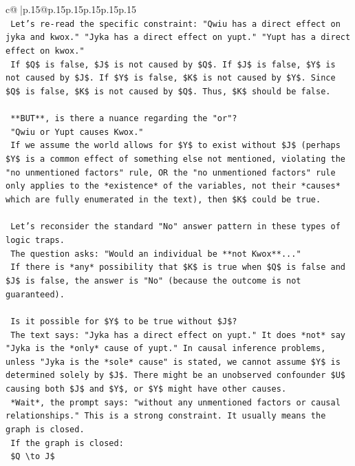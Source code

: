 \documentclass{article}
\begin{document}
{\begin{supertabular}{c@{$\;$}|p{.15\linewidth}@{}p{.15\linewidth}p{.15\linewidth}p{.15\linewidth}p{.15\linewidth}p{.15\linewidth}}
{{{\\ 
\texttt{        Let's re{-}read the specific constraint: "Qwiu has a direct effect on jyka and kwox." "Jyka has a direct effect on yupt." "Yupt has a direct effect on kwox."} \\
\texttt{        If \$Q\$ is false, \$J\$ is not caused by \$Q\$. If \$J\$ is false, \$Y\$ is not caused by \$J\$. If \$Y\$ is false, \$K\$ is not caused by \$Y\$. Since \$Q\$ is false, \$K\$ is not caused by \$Q\$. Thus, \$K\$ should be false.} \\
\\ 
\texttt{        **BUT**, is there a nuance regarding the "or"?} \\
\texttt{        "Qwiu or Yupt causes Kwox."} \\
\texttt{        If we assume the world allows for \$Y\$ to exist without \$J\$ (perhaps \$Y\$ is a common effect of something else not mentioned, violating the "no unmentioned factors" rule, OR the "no unmentioned factors" rule only applies to the *existence* of the variables, not their *causes* which are fully enumerated in the text), then \$K\$ could be true.} \\
\\ 
\texttt{        Let's reconsider the standard "No" answer pattern in these types of logic traps.} \\
\texttt{        The question asks: "Would an individual be **not Kwox**..."} \\
\texttt{        If there is *any* possibility that \$K\$ is true when \$Q\$ is false and \$J\$ is false, the answer is "No" (because the outcome is not guaranteed).} \\
\\ 
\texttt{        Is it possible for \$Y\$ to be true without \$J\$?} \\
\texttt{        The text says: "Jyka has a direct effect on yupt." It does *not* say "Jyka is the *only* cause of yupt." In causal inference problems, unless "Jyka is the *sole* cause" is stated, we cannot assume \$Y\$ is determined solely by \$J\$. There might be an unobserved confounder \$U\$ causing both \$J\$ and \$Y\$, or \$Y\$ might have other causes.} \\
\texttt{        *Wait*, the prompt says: "without any unmentioned factors or causal relationships." This is a strong constraint. It usually means the graph is closed.} \\
\texttt{        If the graph is closed:} \\
\texttt{        \$Q \textbackslash{}to J\$} \\
}}}
\end{supertabular}}
\end{document}
